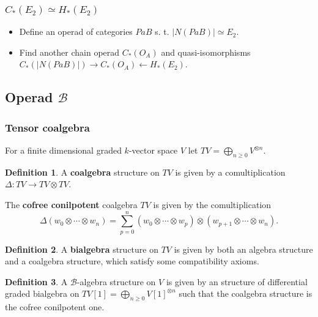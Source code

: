 \documentclass{beamer}
\theoremstyle{definition}
\newtheorem{defi}{Definition}
\begin{document}
\begin{frame}
\frametitle{$C_*(E_2)\simeq H_*(E_2)$}
\begin{itemize}
	\item Define an operad of categories $PaB$ s. t. $|N(PaB)|\simeq E_2$. \checkmark
	\item Find another chain operad $C_*(O_A)$ and quasi-isomorphisms $C_*(|N(PaB)|)\to C_*(O_A)\leftarrow H_*(E_2)$. \checkmark
\end{itemize}
\end{frame}
\subsection{Operad $\mathcal{B}$}

\begin{frame}
\frametitle{Tensor coalgebra}

	For a finite dimensional graded $k$-vector space $V$ let $TV=\bigoplus_{n\geq 0} V^{\otimes n}$. \pause
	
	\begin{defi}
		A \textbf{coalgebra} structure on $TV$ is given by a comultiplication $\Delta:TV\to TV\otimes TV$. 
	\end{defi}\pause

\begin{example}
	The \textbf{cofree conilpotent} coalgebra $TV$ is given by the comultiplication
	\[
	\Delta(w_0\otimes\cdots\otimes w_n)=\sum_{p=0}^n(w_0\otimes\cdots \otimes w_p)\otimes (w_{p+1}\otimes\cdots\otimes w_n).
	\]
\end{example}

\end{frame}

\begin{frame}
\begin{defi}
	A \textbf{bialgebra} structure on $TV$ is given by both an algebra structure and a coalgebra structure, which satisfy some compatibility axioms.
\end{defi}\pause

\begin{defi}
	A $\mathcal{B}$-algebra structure on $V$  is given by an structure of differential graded bialgebra on $TV[1]=\bigoplus_{n\geq 0} V[1]^{\otimes n}$ such that the coalgebra structure is the cofree conilpotent one.
\end{defi}
\end{frame}
\end{document}
